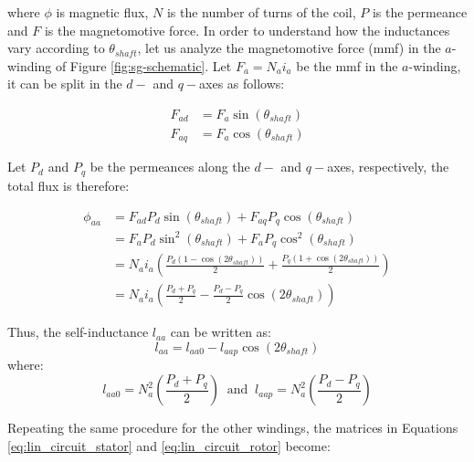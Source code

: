 \noindent where $\phi$ is magnetic flux, $N$ is the number of turns of the coil,
$P$ is the permeance and $F$ is the magnetomotive force. In order to understand
how the inductances vary according to $\theta_{shaft}$, let us analyze the
magnetomotive force (mmf) in the $a$-winding of Figure \ref{fig:sg-schematic}.
Let $F_a = N_a i_a$ be the mmf in the $a$-winding, it can be split in the $d-$
and $q-$axes as follows:

\begin{equation}
    \begin{aligned}
        F_{ad} &= F_a \sin{(\theta_{shaft})}\\
        F_{aq} &= F_a \cos{(\theta_{shaft})}
    \end{aligned}
\end{equation}

Let $P_d$ and $P_q$ be the permeances along the $d-$ and $q-$axes, respectively,
the total flux is therefore:

\begin{equation}
    \begin{aligned}
        \phi_{aa} &= F_{ad} P_d \sin{(\theta_{shaft})} + F_{aq} P_q \cos{(\theta_{shaft})}\\
        &= F_{a} P_d \sin^2{(\theta_{shaft})} + F_{a} P_q \cos^2{(\theta_{shaft})}\\
        &= N_a i_a \left(\frac{P_d(1-\cos{(2\theta_{shaft})})}{2} + \frac{P_q(1+\cos{(2\theta_{shaft})})}{2}\right)\\
        &= N_a i_a \left(\frac{P_d + P_q}{2} - \frac{P_d - P_q}{2}\cos{(2\theta_{shaft})}\right) 
    \end{aligned}
\end{equation}

Thus, the self-inductance $l_{aa}$ can be written as:
\begin{equation*}
    l_{aa} = l_{aa0} - l_{aap}\cos{(2\theta_{shaft})}
\end{equation*} 
\noindent where:
\begin{equation*}
    l_{aa0} = N_a^2\left(\frac{P_d + P_q}{2}\right)\;\; \text{and} \;\; l_{aap} = N_a^2\left(\frac{P_d - P_q}{2}\right)
\end{equation*}

Repeating the same procedure for the other windings, the matrices in Equations
\ref{eq:lin_circuit_stator} and \ref{eq:lin_circuit_rotor} become:

